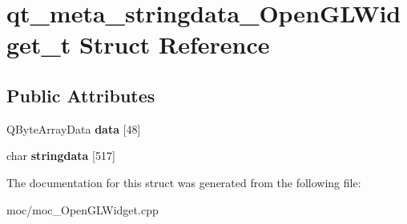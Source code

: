 \hypertarget{structqt__meta__stringdata___open_g_l_widget__t}{\section{qt\-\_\-meta\-\_\-stringdata\-\_\-\-Open\-G\-L\-Widget\-\_\-t Struct Reference}
\label{structqt__meta__stringdata___open_g_l_widget__t}
}
\subsection*{Public Attributes}
\begin{DoxyCompactItemize}
\item 
\hypertarget{structqt__meta__stringdata___open_g_l_widget__t_ad12a546ae59866732c758206e9e72938}{Q\-Byte\-Array\-Data {\bfseries data} \mbox{[}48\mbox{]}}\label{structqt__meta__stringdata___open_g_l_widget__t_ad12a546ae59866732c758206e9e72938}

\item 
\hypertarget{structqt__meta__stringdata___open_g_l_widget__t_a356daa95022344d6aa7de96775220623}{char {\bfseries stringdata} \mbox{[}517\mbox{]}}\label{structqt__meta__stringdata___open_g_l_widget__t_a356daa95022344d6aa7de96775220623}

\end{DoxyCompactItemize}


The documentation for this struct was generated from the following file\-:\begin{DoxyCompactItemize}
\item 
moc/moc\-\_\-\-Open\-G\-L\-Widget.\-cpp\end{DoxyCompactItemize}
